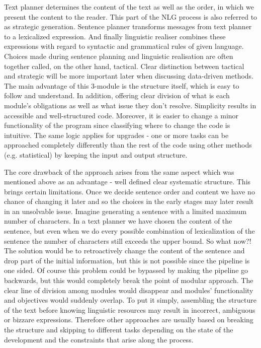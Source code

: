 Text planner determines the content of the text as well as the order, in which we present the content to the reader. This part of the NLG process is also referred to as strategic generation. Sentence planner transforms messages from text planner to a lexicalized expression. And finally linguistic realiser combines these expressions with regard to syntactic and grammatical rules of given language. Choices made during sentence planning and linguistic realisation are often together called, on the other hand, tactical. Clear distinction between tactical and strategic will be more important later when discussing data-driven methods.
The main advantage of this 3-module is the structure itself, which is easy to follow and understand. In addition, offering clear division of what is each module’s obligations as well as what issue they don’t resolve. Simplicity results in accessible and well-structured code. Moreover, it is easier to change a minor functionality of the program since classifying where to change the code is intuitive. The same logic applies for upgrades - one or more tasks can be approached completely differently than the rest of the code using other methods (e.g. statistical) by keeping the input and output structure.

The core drawback of the approach arises from the same aspect which was mentioned above as an advantage - well defined clear systematic structure. This brings certain limitations. Once we decide sentence order and content we have no chance of changing it later and so the choices in the early stages may later result in an unsolvable issue. Imagine generating a sentence with a limited maximum number of characters. In a text planner we have chosen the content of the sentence, but even when we do every possible combination of lexicalization of the sentence the number of characters still exceeds the upper bound. So what now?! The solution would be to retroactively change the content of the sentence and drop part of the initial information, but this is not possible since the pipeline is one sided. Of course this problem could be bypassed by making the pipeline go backwards, but this would completely break the point of modular approach. The clear line of division among modules would disappear and modules' functionality and objectives would suddenly overlap. To put it simply, assembling the structure of the text before knowing linguistic resources may result in incorrect, ambiguous or bizzare expressions. Therefore other approaches are usually based on breaking the structure and skipping to different tasks depending on the state of the development and the constraints that arise along the process.


